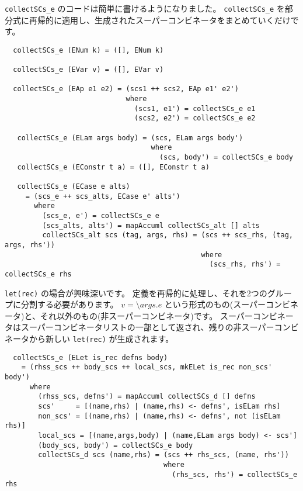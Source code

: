\documentclass{jarticle}
\begin{document}
\texttt{collectSCs\_e} のコードは簡単に書けるようになりました。
\texttt{collectSCs\_e} を部分式に再帰的に適用し、生成されたスーパーコンビネータをまとめていくだけです。

\begin{verbatim}
  collectSCs_e (ENum k) = ([], ENum k)

  collectSCs_e (EVar v) = ([], EVar v)

  collectSCs_e (EAp e1 e2) = (scs1 ++ scs2, EAp e1' e2')
                             where
                               (scs1, e1') = collectSCs_e e1
                               (scs2, e2') = collectSCs_e e2

   collectSCs_e (ELam args body) = (scs, ELam args body')
                                   where
                                     (scs, body') = collectSCs_e body
   collectSCs_e (EConstr t a) = ([], EConstr t a)

   collectSCs_e (ECase e alts)
     = (scs_e ++ scs_alts, ECase e' alts')
       where
         (scs_e, e') = collectSCs_e e
         (scs_alts, alts') = mapAccuml collectSCs_alt [] alts
         collectSCs_alt scs (tag, args, rhs) = (scs ++ scs_rhs, (tag, args, rhs'))
                                               where
                                                 (scs_rhs, rhs') = collectSCs_e rhs
\end{verbatim}

\texttt{let(rec)} の場合が興味深いです。
定義を再帰的に処理し、それを2つのグループに分割する必要があります。
$v = \texttt{\textbackslash} args \texttt{.} e$ という形式のもの(スーパーコンビネータ)と、それ以外のもの(非スーパーコンビネータ)です。
スーパーコンビネータはスーパーコンビネータリストの一部として返され、残りの非スーパーコンビネータから新しい \texttt{let(rec)} が生成されます。

\begin{verbatim}
  collectSCs_e (ELet is_rec defns body)
    = (rhss_scs ++ body_scs ++ local_scs, mkELet is_rec non_scs' body')
      where
        (rhss_scs, defns') = mapAccuml collectSCs_d [] defns
        scs'     = [(name,rhs) | (name,rhs) <- defns', isELam rhs]
        non_scs' = [(name,rhs) | (name,rhs) <- defns', not (isELam rhs)]
        local_scs = [(name,args,body) | (name,ELam args body) <- scs']
        (body_scs, body') = collectSCs_e body
        collectSCs_d scs (name,rhs) = (scs ++ rhs_scs, (name, rhs'))
                                      where
                                        (rhs_scs, rhs') = collectSCs_e rhs
\end{verbatim}
\end{document}
